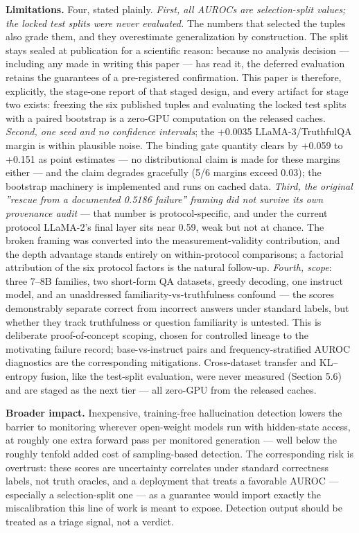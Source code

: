 \textbf{Limitations.} Four, stated plainly. \textit{First, all AUROCs are selection-split values; the locked test splits were never evaluated.} The numbers that selected the tuples also grade them, and they overestimate generalization by construction. The split stays sealed at publication for a scientific reason: because no analysis decision --- including any made in writing this paper --- has read it, the deferred evaluation retains the guarantees of a pre-registered confirmation. This paper is therefore, explicitly, the stage-one report of that staged design, and every artifact for stage two exists: freezing the six published tuples and evaluating the locked test splits with a paired bootstrap is a zero-GPU computation on the released caches. \textit{Second, one seed and no confidence intervals}; the +0.0035 LLaMA-3/TruthfulQA margin is within plausible noise. The binding gate quantity clears by +0.059 to +0.151 as point estimates --- no distributional claim is made for these margins either --- and the claim degrades gracefully (5/6 margins exceed 0.03); the bootstrap machinery is implemented and runs on cached data. \textit{Third, the original ''rescue from a documented 0.5186 failure'' framing did not survive its own provenance audit} --- that number is protocol-specific, and under the current protocol LLaMA-2's final layer sits near 0.59, weak but not at chance. The broken framing was converted into the measurement-validity contribution, and the depth advantage stands entirely on within-protocol comparisons; a factorial attribution of the six protocol factors is the natural follow-up. \textit{Fourth, scope}: three 7--8B families, two short-form QA datasets, greedy decoding, one instruct model, and an unaddressed familiarity-vs-truthfulness confound --- the scores demonstrably separate correct from incorrect answers under standard labels, but whether they track truthfulness or question familiarity is untested. This is deliberate proof-of-concept scoping, chosen for controlled lineage to the motivating failure record; base-vs-instruct pairs and frequency-stratified AUROC diagnostics are the corresponding mitigations. Cross-dataset transfer and KL--entropy fusion, like the test-split evaluation, were never measured (Section 5.6) and are staged as the next tier --- all zero-GPU from the released caches.

\textbf{Broader impact.} Inexpensive, training-free hallucination detection lowers the barrier to monitoring wherever open-weight models run with hidden-state access, at roughly one extra forward pass per monitored generation --- well below the roughly tenfold added cost of sampling-based detection. The corresponding risk is overtrust: these scores are uncertainty correlates under standard correctness labels, not truth oracles, and a deployment that treats a favorable AUROC --- especially a selection-split one --- as a guarantee would import exactly the miscalibration this line of work is meant to expose. Detection output should be treated as a triage signal, not a verdict.
